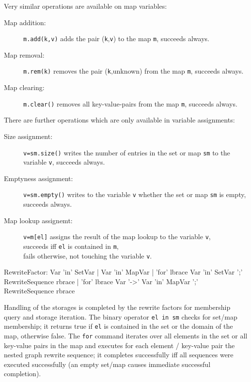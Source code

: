 \noindent Very similar operations are available on map variables:

\begin{description}
\item[Map addition:] \texttt{m.add(k,v)} adds the pair (\texttt{k},\texttt{v}) to the map \texttt{m}, succeeds always.
\item[Map removal:] \texttt{m.rem(k)} removes the pair (\texttt{k},unknown) from the map \texttt{m}, succeeds always.
\item[Map clearing:] \texttt{m.clear()} removes all key-value-pairs from the map \texttt{m}, succeeds always.
\end{description}

\noindent There are further operations which are only available in variable assignments:

\begin{description}
\item[Size assignment:] \texttt{v=sm.size()} writes the number of entries in the set or map \texttt{sm} to the variable \texttt{v}, succeeds always.
\item[Emptyness assignment:] \texttt{v=sm.empty()} writes to the variable \texttt{v} whether the set or map \texttt{sm} is empty,\\ succeeds always.
\item[Map lookup assignemt:] \texttt{v=m[el]} assigns the result of the map lookup to the variable \texttt{v},\\succeeds iff \texttt{el} is contained in \texttt{m},\\ fails otherwise, not touching the variable \texttt{v}.
\end{description}

\begin{rail}
  RewriteFactor:
    Var 'in' SetVar |
    Var 'in' MapVar |
    'for' lbrace Var 'in' SetVar ';' RewriteSequence rbrace |
    'for' lbrace Var '->' Var 'in' MapVar ';' RewriteSequence rbrace
\end{rail}

\noindent Handling of the storages is completed by the rewrite factors for membership query and storage iteration.
The binary operator \texttt{el in sm} checks for set/map membership; it returns true if \texttt{el} is contained in the set or the domain of the map, otherwise false.
The \texttt{for} command iterates over all elements in the set or all key-value pairs in the map and executes for each element / key-value pair the nested graph rewrite sequence; it completes successfully iff all sequences were executed successfully (an empty set/map causes immediate successful completion).

